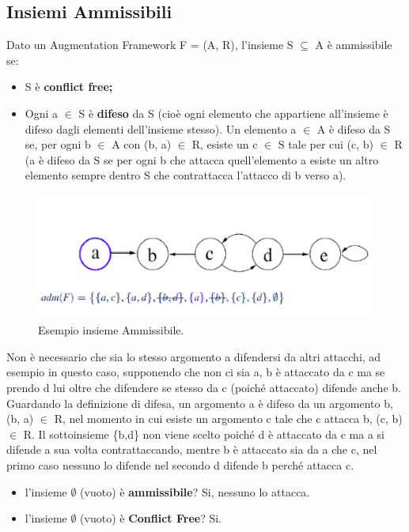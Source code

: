 \subsection{Insiemi Ammissibili}
Dato un Augmentation Framework F = (A, R), l'insieme S $\subseteq$ A è
ammissibile se:
\begin{itemize}
    \item S è \textbf{conflict free;}
    \item Ogni a $\in$ S è \textbf{difeso} da S (cioè ogni elemento che
          appartiene all'insieme è difeso dagli elementi dell'insieme stesso). Un
          elemento a $\in$ A è difeso da S se, per ogni b $\in$ A con (b, a) $\in$ R,
          esiste un c $\in$ S tale per cui (c, b) $\in$ R (a è difeso da S se per ogni
          b che attacca quell'elemento a esiste un altro elemento sempre dentro S che
          contrattacca l'attacco di b verso a).
\end{itemize}
\begin{figure}[htp]
    \centering
    \includegraphics[width=12cm, keepaspectratio]{img/Cap6/ammissibile.png}
    \caption{Esempio insieme Ammissibile.}
\end{figure}
Non è necessario che sia lo stesso argomento a difendersi da altri attacchi, ad
esempio in questo caso, supponendo che non ci sia a, b è attaccato da c ma se
prendo d lui oltre che difendere se stesso da c (poiché attaccato) difende anche
b. Guardando la definizione di difesa, un argomento a è difeso da un argomento
b, (b, a) $\in$ R, nel momento in cui esiste un argomento c tale che c attacca
b, (c, b) $\in$ R. Il sottoinsieme \{b,d\} non viene scelto poiché d è attaccato
da c ma a si difende a sua volta contrattaccando, mentre b è attaccato sia da a
che c, nel primo caso nessuno lo difende nel secondo d difende b perché attacca
c.
\begin{itemize}
    \item l'insieme $\emptyset$ (vuoto) è \textbf{ammissibile}? Si, nessuno lo attacca.
    \item l'insieme $\emptyset$ (vuoto) è \textbf{Conflict Free}? Si.
\end{itemize}

